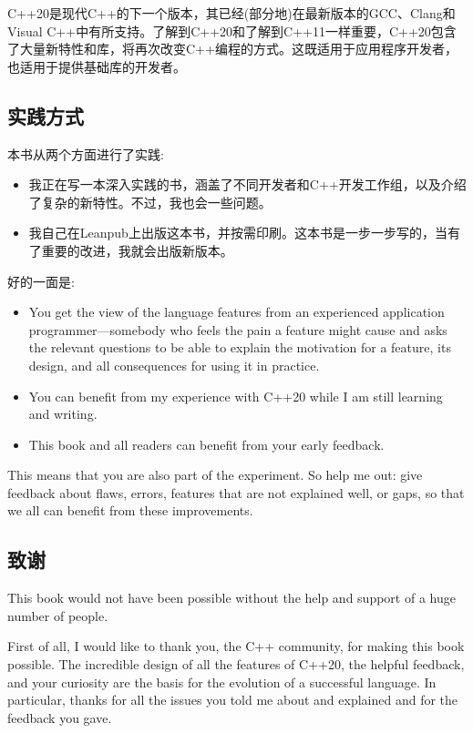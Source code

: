 
C++20是现代C++的下一个版本，其已经(部分地)在最新版本的GCC、Clang和Visual C++中有所支持。了解到C++20和了解到C++11一样重要，C++20包含了大量新特性和库，将再次改变C++编程的方式。这既适用于应用程序开发者，也适用于提供基础库的开发者。

\subsection*{实践方式}

本书从两个方面进行了实践:

\begin{itemize}
\item
我正在写一本深入实践的书，涵盖了不同开发者和C++开发工作组，以及介绍了复杂的新特性。不过，我也会一些问题。

\item
我自己在Leanpub上出版这本书，并按需印刷。这本书是一步一步写的，当有了重要的改进，我就会出版新版本。
\end{itemize}

好的一面是:

\begin{itemize}
\item
You get the view of the language features from an experienced application programmer—somebody who feels the pain a feature might cause and asks the relevant questions to be able to explain the motivation for a feature, its design, and all consequences for using it in practice.

\item
You can benefit from my experience with C++20 while I am still learning and writing.

\item
This book and all readers can benefit from your early feedback.
\end{itemize}

This means that you are also part of the experiment. So help me out: give feedback about flaws, errors, features that are not explained well, or gaps, so that we all can benefit from these improvements.

\subsection*{致谢}

This book would not have been possible without the help and support of a huge number of people.

First of all, I would like to thank you, the C++ community, for making this book possible. The incredible design of all the features of C++20, the helpful feedback, and your curiosity are the basis for the evolution of a successful language. In particular, thanks for all the issues you told me about and explained and for the feedback you gave.

